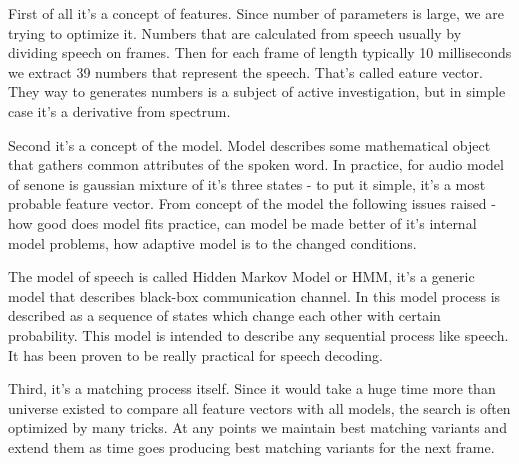 \documentclass[12pt,a4paper,oneside]{memoir}
\begin{document}
First of all it's a concept of features. Since number of parameters is large, we are trying to optimize it. Numbers that are calculated from speech usually by dividing speech on frames. Then for each frame of length typically 10 milliseconds we extract 39 numbers that represent the speech. That's called eature vector. They way to generates numbers is a subject of active investigation, but in simple case it's a derivative from spectrum.

Second it's a concept of the model. Model describes some mathematical object that gathers common attributes of the spoken word. In practice, for audio model of senone is gaussian mixture of it's three states - to put it simple, it's a most probable feature vector. From concept of the model the following issues raised - how good does model fits practice, can model be made better of it's internal model problems, how adaptive model is to the changed conditions.

The model of speech is called Hidden Markov Model or HMM, it's a generic model that describes black-box communication channel. In this model process is described as a sequence of states which change each other with certain probability. This model is intended to describe any sequential process like speech. It has been proven to be really practical for speech decoding.

Third, it's a matching process itself. Since it would take a huge time more than universe existed to compare all feature vectors with all models, the search is often optimized by many tricks. At any points we maintain best matching variants and extend them as time goes producing best matching variants for the next frame.
\end{document}
